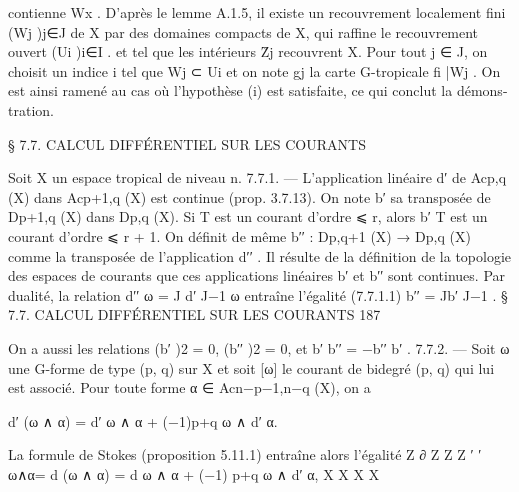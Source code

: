 \documentclass[
  10pt,
]{article}
\newenvironment{Shaded}{}{}
\newcommand{\NormalTok}[1]{#1}
\begin{document}
\begin{Shaded}
\begin{Highlighting}[]
\NormalTok{contienne Wx .}
\NormalTok{   D’après le lemme A.1.5, il existe un recouvrement localement fini (Wj )j∈J de X par}
\NormalTok{des domaines compacts de X, qui raffine le recouvrement ouvert (Ui )i∈I . et tel que les}
\NormalTok{intérieurs Z̊j recouvrent X. Pour tout j ∈ J, on choisit un indice i tel que Wj ⊂ Ui et}
\NormalTok{on note gj la carte G{-}tropicale fi |Wj .}
\NormalTok{   On est ainsi ramené au cas où l’hypothèse (i) est satisfaite, ce qui conclut la démons{-}}
\NormalTok{tration.}



\NormalTok{            § 7.7. CALCUL DIFFÉRENTIEL SUR LES COURANTS}

\NormalTok{  Soit X un espace tropical de niveau n.}
\NormalTok{7.7.1. — L’application linéaire d′ de Acp,q (X) dans Acp+1,q (X) est continue (prop. 3.7.13).}
\NormalTok{On note b′ sa transposée de Dp+1,q (X) dans Dp,q (X). Si T est un courant d’ordre ⩽ r,}
\NormalTok{alors b′ T est un courant d’ordre ⩽ r + 1.}
\NormalTok{   On définit de même b′′ : Dp,q+1 (X) → Dp,q (X) comme la transposée de l’application d′′ .}
\NormalTok{   Il résulte de la définition de la topologie des espaces de courants que ces applications}
\NormalTok{linéaires b′ et b′′ sont continues.}
\NormalTok{   Par dualité, la relation d′′ ω = J d′ J−1 ω entraîne l’égalité}
\NormalTok{(7.7.1.1)                                   b′′ = Jb′ J−1 .}
\NormalTok{                          § 7.7. CALCUL DIFFÉRENTIEL SUR LES COURANTS                  187}

\NormalTok{  On a aussi les relations (b′ )2 = 0, (b′′ )2 = 0, et b′ b′′ = −b′′ b′ .}
\NormalTok{7.7.2. — Soit ω une G{-}forme de type (p, q) sur X et soit [ω] le courant de bidegré (p, q)}
\NormalTok{qui lui est associé. Pour toute forme α ∈ Acn−p−1,n−q (X), on a}

\NormalTok{                              d′ (ω ∧ α) = d′ ω ∧ α + (−1)p+q ω ∧ d′ α.}

\NormalTok{La formule de Stokes (proposition 5.11.1) entraîne alors l’égalité}
\NormalTok{            Z ∂         Z               Z                        Z}
\NormalTok{                             ′               ′}
\NormalTok{                ω∧α=       d (ω ∧ α) =      d ω ∧ α + (−1)   p+q}
\NormalTok{                                                                   ω ∧ d′ α,}
\NormalTok{                 X               X                   X                      X}


\end{Highlighting}
\end{Shaded}
\end{document}

